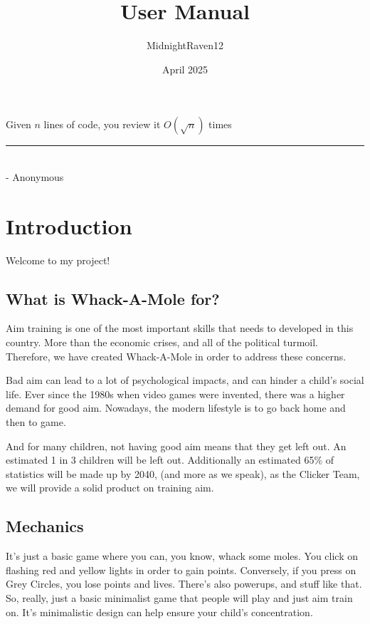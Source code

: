 \documentclass[mdthm]{scrartcl}
\title{User Manual}
\author{MidnightRaven12}
\date{April 2025}
\begin{document}
    \maketitle

    \begin{flushright}
        \begin{minipage}{0.3\textwidth}
            \footnotesize
            Given $n$ lines of code, you review it $O(\sqrt{n})$ times \\
            \noindent\rule{0.3\textwidth}{0.4pt} \\ %
            - Anonymous
        \end{minipage}
    \end{flushright}

    \tableofcontents


\section{Introduction}
  
Welcome to my project! 

\subsection{What is Whack-A-Mole for?}

Aim training is one of the most important skills that needs to developed in this country. More than the economic crises, and all of the political turmoil. Therefore, we have created Whack-A-Mole in order to address these concerns.

Bad aim can lead to a lot of psychological impacts, and can hinder a child’s social life. Ever since the 1980s when video games were invented, there was a higher demand for good aim. Nowadays, the modern lifestyle is to go back home and then to game. 

And for many children, not having good aim means that they get left out. An estimated 1 in 3 children will be left out. Additionally an estimated 65\% of statistics will be made up by 2040, (and more as we speak), as the Clicker Team, we will provide a solid product on training aim. 

\subsection{Mechanics}

It's just a basic game where you can, you know, whack some moles. You click on flashing red and yellow lights in order to gain points. Conversely, if you press on Grey Circles, you lose points and lives. There's also powerups, and stuff like that. So, really, just a basic minimalist game that people will play and just aim train on. It's minimalistic design can help ensure your child's concentration. 
\end{document}
